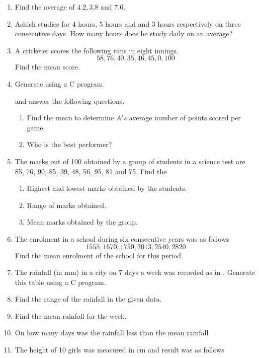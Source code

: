 \begin{enumerate}[label=\thesubsection.\arabic*, ref=\thesubsection.\theenumi]
\item Find the average of $4.2, 3.8$ and $7.6$.
\item Ashish studies for 4 hours, 5 hours and and 3 hours respectively on three consecutive days.  How many hours does he study daily on an average?
\item A cricketer scores the following runs in eight innings.
	$$58, 76, 40, 35, 46, 45, 0, 100$$
	Find the mean score.
\item Generate 
using a C program
	\begin{table}[H]
  \centering
  
  \caption{}
  \label{tab:player}
\end{table}
and answer the following questions.
\begin{enumerate}
	\item Find the mean to determine $A's$ average number of points scored per game.
	\item Who is the best performer?
\end{enumerate}
\item The marks out of 100 obtained by a group of students in a science test are 85, 76, 90, 85, 39, 48, 56, 95, 81 and 75.  Find the 
	\begin{enumerate}
		\item Highest and lowest marks obtained by the students.
		\item Range of marks obtained.
		\item  Mean marks obtained by the group.
	\end{enumerate}
\item The enrolment in a school during six consecutive years was as follows  
	$$1555, 1670, 1750, 2013, 2540, 2820$$
	Find the mean enrolment of the school for this period.
\item The rainfall (in mm) in a city on 7 days a week was recorded as in 
  .  Generate this table using a C program.
	\begin{table}[H]
  \centering
  
  \caption{}
  \label{tab:rainfall}
\end{table}
\item Find the range of the rainfall in the given data.
\item Find the mean rainfall for the week.
\item On how many days was the rainfall less than the mean rainfall 
\item The height of 10 girls was measured in cm and result was as follows

\end{enumerate}
